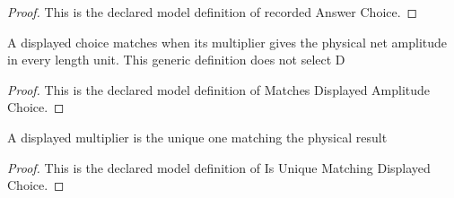 \begin{proof}
  This is the declared model definition of recorded Answer Choice.
\end{proof}
\begin{definition}
  \label{def:physics:phyx-mini-0313:phyxminiproblems-problemphyxmini0313-matchesdisplayedamplitudechoice}
  A displayed choice matches when its multiplier gives the physical net amplitude in every length unit. This generic definition does not select D
\end{definition}
\begin{proof}
  This is the declared model definition of Matches Displayed Amplitude Choice.
\end{proof}
\begin{definition}
  \label{def:physics:phyx-mini-0313:phyxminiproblems-problemphyxmini0313-isuniquematchingdisplayedchoice}
  A displayed multiplier is the unique one matching the physical result
\end{definition}
\begin{proof}
  This is the declared model definition of Is Unique Matching Displayed Choice.
\end{proof}
